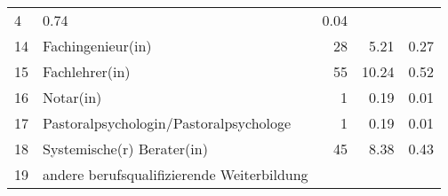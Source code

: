 \begin{longtable}{lXrrr}
       \num{4} &
       \num[round-mode=places,round-precision=2]{0,74} &
         \num[round-mode=places,round-precision=2]{0,04} \\

     14 &
     \multicolumn{1}{X}{ Fachingenieur(in)   } &


       \num{28} &
       \num[round-mode=places,round-precision=2]{5,21} &
         \num[round-mode=places,round-precision=2]{0,27} \\

     15 &
     \multicolumn{1}{X}{ Fachlehrer(in)   } &


       \num{55} &
       \num[round-mode=places,round-precision=2]{10,24} &
         \num[round-mode=places,round-precision=2]{0,52} \\

     16 &
     \multicolumn{1}{X}{ Notar(in)   } &


       \num{1} &
       \num[round-mode=places,round-precision=2]{0,19} &
         \num[round-mode=places,round-precision=2]{0,01} \\

     17 &
     \multicolumn{1}{X}{ Pastoralpsychologin/Pastoralpsychologe   } &


       \num{1} &
       \num[round-mode=places,round-precision=2]{0,19} &
         \num[round-mode=places,round-precision=2]{0,01} \\

     18 &
     \multicolumn{1}{X}{ Systemische(r) Berater(in)   } &


       \num{45} &
       \num[round-mode=places,round-precision=2]{8,38} &
         \num[round-mode=places,round-precision=2]{0,43} \\

     19 &
     \multicolumn{1}{X}{ andere berufsqualifizierende Weiterbildung   } &



\end{longtable}
